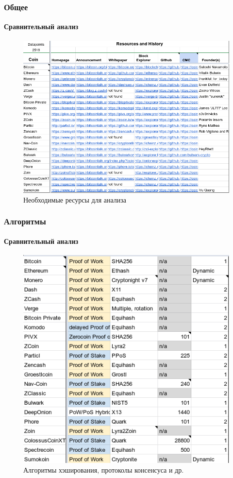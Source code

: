 \documentclass{beamer}
\begin{document}
\begin{frame}
    \frametitle{Общее}
    \framesubtitle{Сравнительный анализ}
    \begin{figure}
        \includegraphics[width=0.79\columnwidth]{sravn1.png}
        \caption{Необходимые ресурсы для анализа}
    \end{figure}
\end{frame}

\begin{frame}
    \frametitle{Алгоритмы}
    \framesubtitle{Сравнительный анализ}
    \begin{figure}
        \includegraphics[width=0.6\columnwidth]{sravn2.png}
        \caption{Алгоритмы хэширования, протоколы консенсуса и др.}
    \end{figure}
\end{frame}
\end{document}
